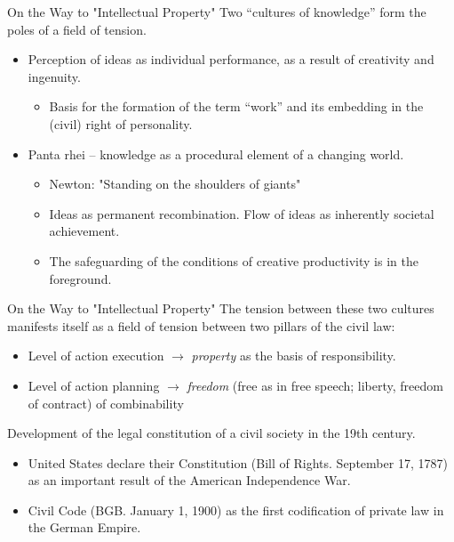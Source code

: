 \documentclass{beamer}
\begin{document}
\begin{frame}{On the Way to "Intellectual Property"}
Two “cultures of knowledge” form the poles of a field of tension.
\begin{itemize}
\item Perception of ideas as individual performance, as a result of creativity
  and ingenuity.
  \begin{itemize}
  \item Basis for the formation of the term “work” and its embedding in the
    (civil) right of personality.
  \end{itemize}
\item Panta rhei -- knowledge as a procedural element of a changing world.
  \begin{itemize}
  \item Newton: "Standing on the shoulders of giants"
  \item Ideas as permanent recombination. Flow of ideas as inherently societal
    achievement.
  \item The safeguarding of the conditions of creative productivity is in the
    foreground.
  \end{itemize}
\end{itemize}
\end{frame}

\begin{frame}{On the Way to "Intellectual Property"}
The tension between these two cultures manifests itself as a field of
tension between two pillars of the civil law:
\begin{itemize}
\item Level of action execution $\to$ \emph{property} as the basis of
  responsibility.
\item Level of action planning $\to$ \emph{freedom} (free as in free speech;
  liberty, freedom of contract) of combinability
\end{itemize}
Development of the legal constitution of a civil society in the 19th century.
\begin{itemize}
\item United States declare their Constitution (Bill of Rights. September 17,
  1787) as an important result of the American Independence War.
\item Civil Code (BGB. January 1, 1900) as the first codification of private
  law in the German Empire.
\end{itemize}
\end{frame}
\end{document}
